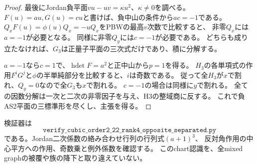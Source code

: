\begin{proof}
最後にJordan負平面$vu-uv=\kappa u^2$、$\kappa\ne0$を調べる。
$F(u)=a u,G(u)=c u$と書けば、負中山の条件から$ac=-1$である。
$Q_xF(u)=\phi(u)Q_x=-uQ_x$をPBWの最高$v$次数で比較すると、
非零$Q_x$には$a=-1$が必要となる。
同様に非零$Q_y$には$c=-1$が必要である。
どちらも成り立たなければ、$G_3$は正量子平面の三次式だけであり、積に分解する。

$a=-1$なら$c=1$で、$\operatorname{hdet}F=a^2$と正中山から$p=1$を得る。
$H_3$の各単項式の作用$F^iG^j$と$\phi$の半単純部分を比較すると、$i$は奇数である。
従って全$H_3$が$x$で割れ、$Q_y=0$なので全$G_3$も$x$で割れる。
$c=-1$の場合は同様に$y$で割れる。
全ての因数分解は一次と二次の非零因子を与え、H3の整域商に反する。
これで負AS2平面の三標準形を尽くし、主張を得る。
\end{proof}

検証器は
\[
 \texttt{verify\_cubic\_order2\_22\_rank4\_opposite\_separated.py}
\]
である。Jordan二次係数の絡み合わせ行列の行列式$(a+1)^3$、
反対角作用の中心平方への作用、奇数乗と例外係数を確認する。
このchart認識を、全mixed graphの被覆や族の降下と取り違えていない。
